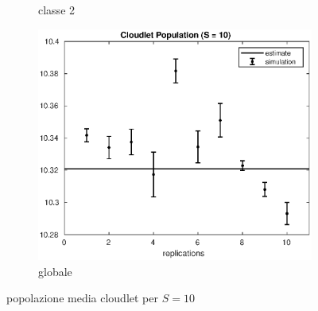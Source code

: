 \begin{figure}[!h]
\begin{subfigure}[t]{0.49\textwidth}
\caption{classe 2}
\label{10_n2clet}
\end{subfigure}
%
\begin{subfigure}[t]{0.5\textwidth}
\includegraphics[width=\textwidth]{figures/simul/10_500K_nclet}
\caption{globale}
\label{10_nclet}
\end{subfigure}
%
\caption{popolazione media cloudlet per $S = 10$}
\end{figure}
%

